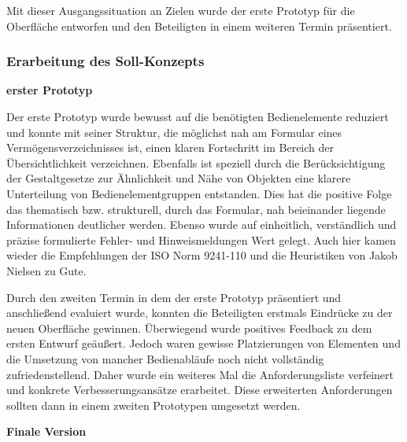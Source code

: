 Mit dieser Ausgangssituation an Zielen wurde der erste Prototyp für die Oberfläche entworfen und den Beteiligten in einem weiteren Termin präsentiert.

\subsubsection{Erarbeitung des Soll-Konzepts}

\textbf{erster Prototyp}

Der erste Prototyp wurde bewusst auf die benötigten Bedienelemente reduziert und konnte mit seiner Struktur, die möglichst nah am Formular eines Vermögensverzeichnisses ist, einen klaren Fortschritt im Bereich der Übersichtlichkeit verzeichnen. Ebenfalls ist speziell durch die Berücksichtigung der Gestaltgesetze zur Ähnlichkeit und Nähe von Objekten eine klarere Unterteilung von Bedienelementgruppen entstanden. Dies hat die positive Folge das thematisch bzw. strukturell, durch das Formular, nah beieinander liegende Informationen deutlicher werden. Ebenso wurde auf einheitlich, verständlich und präzise formulierte Fehler- und Hinweismeldungen Wert gelegt. Auch hier kamen wieder die Empfehlungen der ISO Norm 9241-110 und die Heuristiken von Jakob Nielsen zu Gute.

Durch den zweiten Termin in dem der erste Prototyp präsentiert und anschließend evaluiert wurde, konnten die Beteiligten erstmals Eindrücke zu der neuen Oberfläche gewinnen. Überwiegend wurde positives Feedback zu dem ersten Entwurf geäußert. Jedoch waren gewisse Platzierungen von Elementen und die Umsetzung von mancher Bedienabläufe noch nicht vollständig zufriedenstellend. Daher wurde ein weiteres Mal die Anforderungsliste verfeinert und konkrete Verbesserungsansätze erarbeitet. Diese erweiterten Anforderungen sollten dann in einem zweiten Prototypen umgesetzt werden.

\textbf{Finale Version}

